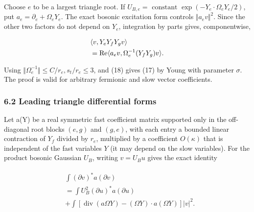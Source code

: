 Choose \(e\) to be a largest triangle root. If
\(U_{B,e}=\text{ constant } \exp (-Y_{e} \cdot  \Omega _{e} Y_{e}/2)\),
put \(a_{e}=\partial _{e}+\Omega _{e} Y_{e}\). The exact bosonic
excitation form controls \(\Vert a_{e} v\Vert ^{2}\). Since the other
two factors do not depend on \(Y_{e}\), integration by parts gives,
componentwise,

\begin{gather*}
\begin{aligned}
& \langle v,Y_{e} Y_{f} Y_{g} v\rangle \\
& =\operatorname{Re} \langle a_{e} v,\Omega _{e}^{-1}(Y_{f} Y_{g})v\rangle .
\end{aligned}\notag
\end{gather*}

Using \(\Vert \Omega _{e}^{-1}\Vert \le C/r_{e}, s_{t}/r_{e}\le 3\), and
(18) gives (17) by Young with parameter \(\sigma\). The proof is valid
for arbitrary fermionic and slow vector coefficients.

\subsubsection{6.2 Leading triangle differential
forms}\label{e-leading-triangle-differential-forms}

Let a(Y) be a real symmetric fast coefficient matrix supported only in
the off-diagonal root blocks \((e,g)\) and \((g,e)\), with each entry a
bounded linear contraction of \(Y_{f}\) divided by \(r_{e}\), multiplied
by a coefficient \(O(\kappa )\) that is independent of the fast
variables \(Y\) (it may depend on the slow variables). For the product
bosonic Gaussian \(U_{B}\), writing \(v=U_{B} u\) gives the exact
identity

\begin{gather*}
\begin{aligned}
& \int  (\partial  v)^{*} a (\partial  v) \\
& =\int  U_{B}^{2} (\partial  u)^{*} a (\partial  u) \\
& +\int  [\operatorname{div} (a \Omega  Y)-(\Omega  Y) \cdot  a(\Omega  Y)] \vert v\vert ^{2}.
\end{aligned}\tag{19}
\end{gather*}

